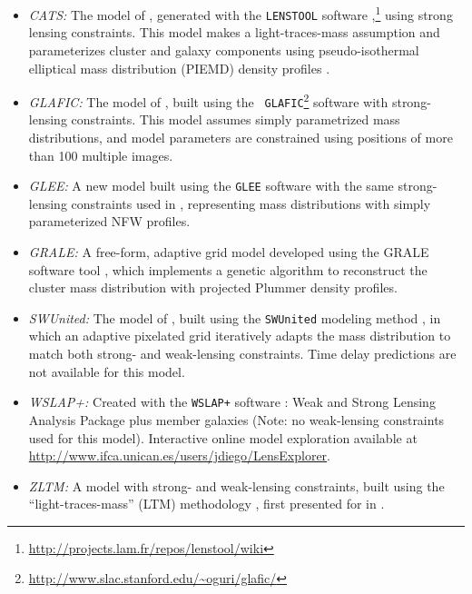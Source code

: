 \bigskip
\begin{itemize}
\item{{\it CATS:} The model of \citet{Jauzac:2014}, generated with
  the {\tt LENSTOOL} software
  \citep{Jullo:2007},\footnote{\url{http://projects.lam.fr/repos/lenstool/wiki}}}
  using strong lensing constraints.  This model makes a
  light-traces-mass assumption and parameterizes cluster and galaxy components
  using pseudo-isothermal elliptical mass distribution (PIEMD) density profiles
  \citep{Eliasdottir:2007, Limousin:2007}.
\item{\it GLAFIC:} The model of \citet{Kawamata:2016}, built using the
  {\tt
    GLAFIC}\footnote{\url{http://www.slac.stanford.edu/~oguri/glafic/}}
  software \citep{Oguri:2010b} with strong-lensing constraints. This
  model assumes simply parametrized mass distributions, and model
  parameters are constrained using positions of more than 100 multiple
  images.
\item{\it GLEE:} A new model built using the {\tt GLEE} software
  \citep{Suyu:2010b, Suyu:2012} with the same strong-lensing
  constraints used in \citet{Caminha:2017}, representing mass
  distributions with simply parameterized NFW profiles. 
\item{{\it GRALE:} A free-form, adaptive grid model developed using
  the GRALE software tool \citep{Liesenborgs:2006, Liesenborgs:2007,
    Mohammed:2014, Sebesta:2016}, which implements a genetic algorithm
  to reconstruct the cluster mass distribution with projected Plummer
  \citeyear{Plummer:1911} density profiles.}
\item{\it SWUnited:} The model of \citet{Hoag:2016}, built using the
  {\tt SWUnited} modeling method \citep{Bradac:2005, Bradac:2009}, in
  which an adaptive pixelated grid iteratively adapts the mass
  distribution to match both strong- and weak-lensing constraints.
  Time delay predictions are not available for this model.
\item{\it WSLAP+:} Created with the {\tt WSLAP+} software
  \citep{Sendra:2014}: Weak and Strong Lensing Analysis Package plus
  member galaxies (Note: no weak-lensing constraints used for this
   model). Interactive online model exploration available at
  \url{http://www.ifca.unican.es/users/jdiego/LensExplorer}.
\item{{\it ZLTM:} A model with strong- and weak-lensing constraints,
  built using the ``light-traces-mass'' (LTM) methodology
  \citep{Zitrin:2009a,Zitrin:2015}, first presented for  in
  \citet{Zitrin:2013a}.}
\end{itemize}
\bigskip    

